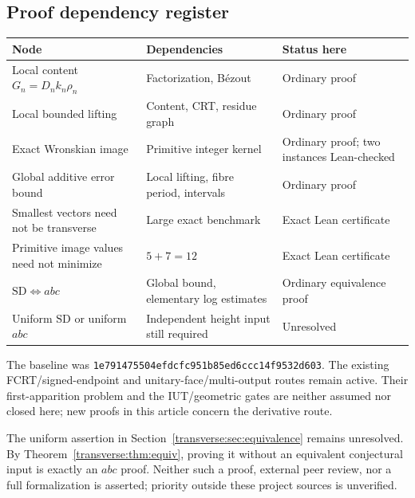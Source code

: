 \subsection{Proof dependency register}
\begin{center}\small
\begin{tabular}{p{}p{}p{}}
\toprule
Node & Dependencies & Status here\\
\midrule
Local content $G_n=D_nk_n\rho_n$ & Factorization, B\'ezout & Ordinary proof\\
Local bounded lifting & Content, CRT, residue graph & Ordinary proof\\
Exact Wronskian image & Primitive integer kernel & Ordinary proof; two instances Lean-checked\\
Global additive error bound & Local lifting, fibre period, intervals & Ordinary proof\\
Smallest vectors need not be transverse & Large exact benchmark & Exact Lean certificate\\
Primitive image values need not minimize & $5+7=12$ & Exact Lean certificate\\
$\mathrm{SD}\Longleftrightarrow abc$ & Global bound, elementary log estimates & Ordinary equivalence proof\\
Uniform $\mathrm{SD}$ or uniform $abc$ & Independent height input still required & Unresolved\\
\bottomrule
\end{tabular}
\end{center}
The baseline was \texttt{1e791475504efdcfc951b85ed6ccc14f9532d603}. The existing FCRT/signed-endpoint and unitary-face/multi-output routes \cite{transverse:signed,transverse:multiflag} remain active. Their first-apparition problem and the IUT/geometric gates are neither assumed nor closed here; new proofs in this article concern the derivative route.

The uniform assertion in Section~\ref{transverse:sec:equivalence} remains unresolved. By Theorem~\ref{transverse:thm:equiv}, proving it without an equivalent conjectural input is exactly an $abc$ proof. Neither such a proof, external peer review, nor a full formalization is asserted; priority outside these project sources is unverified.



\endgroup
